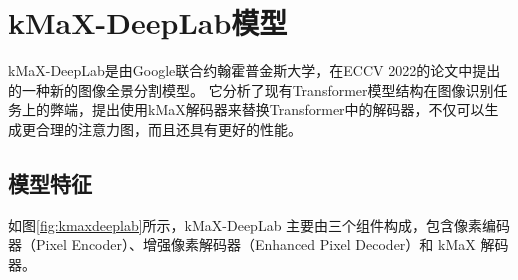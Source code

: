 \section{kMaX-DeepLab模型}

\par kMaX-DeepLab\cite{kmeans_mask_transformer}是由Google联合约翰霍普金斯大学，在ECCV 2022的论文中提出的一种新的图像全景分割模型。
它分析了现有Transformer模型结构在图像识别任务上的弊端，提出使用kMaX解码器来替换Transformer中的解码器，不仅可以生成更合理的注意力图，而且还具有更好的性能。

\subsection{模型特征}

\par 如图\ref{fig:kmaxdeeplab}\cite{kmeans_mask_transformer}所示，kMaX-DeepLab 主要由三个组件构成，包含像素编码器（Pixel Encoder）、增强像素解码器（Enhanced Pixel Decoder）和 kMaX 解码器。

